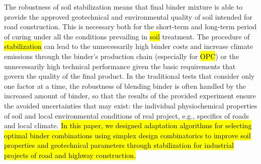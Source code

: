 \documentclass[materials,article,submit,pdftex,moreauthors]{Definitions/mdpi}
\begin{document}
The robustness of soil stabilization\hl{ }means that\hl{ }final binder mixture is able to provide the approved geotechnical and environmental quality of soil intended for road construction. This is necessary both for the short-term and long-term period of curing under all the conditions prevailing in \hl{soil} treatment. The procedure of \hl{stabilization} can lead to the unnecessarily high binder costs and increase climate emissions through the binder's production chain (especially for \hl{OPC}) or the unnecessarily high technical performance given the basic requirements that govern the quality of the final product. In the traditional tests that consider only one factor at a time, the robustness of blending binder is often handled by the increased amount of binder, so that the results of the provided experiment ensure the avoided uncertainties that may exist: the individual physiochemical properties of soil and local environmental conditions of real project, e.g., specifics of roads and local climate. \hl{In this paper, we designed adaptation algorithms for selecting optimal binder combinations using simplex design combinatorics to improve soil properties and geotechnical parameters through stabilization for industrial projects of road and highway construction.}


\end{document}
